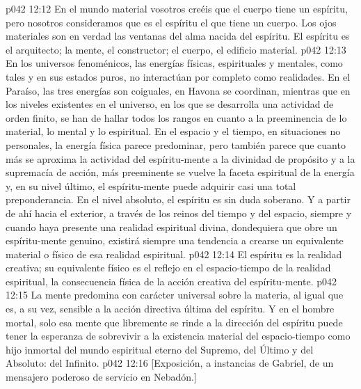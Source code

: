 \vs p042 12:12 \pc En el mundo material vosotros creéis que el cuerpo tiene un espíritu, pero nosotros consideramos que es el espíritu el que tiene un cuerpo. Los ojos materiales son en verdad las ventanas del alma nacida del espíritu. El espíritu es el arquitecto; la mente, el constructor; el cuerpo, el edificio material.
\vs p042 12:13 \pc En los universos fenoménicos, las energías físicas, espirituales y mentales, como tales y en sus estados puros, no interactúan por completo como realidades. En el Paraíso, las tres energías son coiguales, en Havona se coordinan, mientras que en los niveles existentes en el universo, en los que se desarrolla una actividad de orden finito, se han de hallar todos los rangos en cuanto a la preeminencia de lo material, lo mental y lo espiritual. En el espacio y el tiempo, en situaciones no personales, la energía física parece predominar, pero también parece que cuanto más se aproxima la actividad del espíritu\hyp{}mente a la divinidad de propósito y a la supremacía de acción, más preeminente se vuelve la faceta espiritual de la energía y, en su nivel último, el espíritu\hyp{}mente puede adquirir casi una total preponderancia. En el nivel absoluto, el espíritu es sin duda soberano. Y a partir de ahí hacia el exterior, a través de los reinos del tiempo y del espacio, siempre y cuando haya presente una realidad espiritual divina, dondequiera que obre un espíritu\hyp{}mente genuino, existirá siempre una tendencia a crearse un equivalente material o físico de esa realidad espiritual.
\vs p042 12:14 El espíritu es la realidad creativa; su equivalente físico es el reflejo en el espacio\hyp{}tiempo de la realidad espiritual, la consecuencia física de la acción creativa del espíritu\hyp{}mente.
\vs p042 12:15 La mente predomina con carácter universal sobre la materia, al igual que es, a su vez, sensible a la acción directiva última del espíritu. Y en el hombre mortal, solo esa mente que libremente se rinde a la dirección del espíritu puede tener la esperanza de sobrevivir a la existencia material del espacio\hyp{}tiempo como hijo inmortal del mundo espiritual eterno del Supremo, del Último y del Absoluto: del Infinito.
\vsetoff
\vs p042 12:16 [Exposición, a instancias de Gabriel, de un mensajero poderoso de servicio en Nebadón.]
